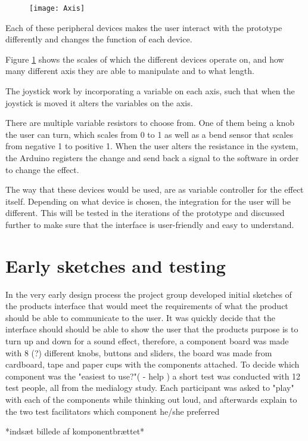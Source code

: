 \begin{figure}[!h] 
\centering
\texttt{[image: Axis]}
\caption{\label{fig:axis}}
\end{figure}



Each of these peripheral devices makes the user interact with the prototype differently and changes the function of each device.

Figure \ref{fig:axis} shows the scales of which the different devices operate on, and how many different axis they are able to manipulate and to what length.
 
The joystick work by incorporating a variable on each axis, such that when the joystick is moved it alters the variables on the axis. 

There are multiple variable resistors to choose from. One of them being a knob the user can turn, which scales from 0 to 1 as well as a bend sensor that scales from negative 1 to positive 1. When the user alters the resistance in the system, the Arduino registers the change and send back a signal to the software in order to change the effect.

The way that these devices would be used, are as variable controller for the effect itself. Depending on what device is chosen, the integration for the user will be different. This will be tested in the iterations of the prototype and discussed further to make sure that the interface is user-friendly and easy to understand. 


\section{Early sketches and testing}
In the very early design process the project group developed initial sketches of the products interface that would meet the requirements of what the product should be able to communicate to the user. It was quickly decide that the interface should should be able to show the user that the products purpose is to turn up and down for a sound effect, therefore, a component board was made with 8 (?) different knobs, buttons and sliders, the board was made from cardboard, tape and paper cups with the components attached. To decide which component was the "easiest to use?"( - help ) a short test was conducted with 12 test people, all from the medialogy study. Each participant was asked to "play" with each of the components while thinking out loud, and afterwards explain to the two test facilitators which component he/she preferred 

*indsæt billede af komponentbrættet*
